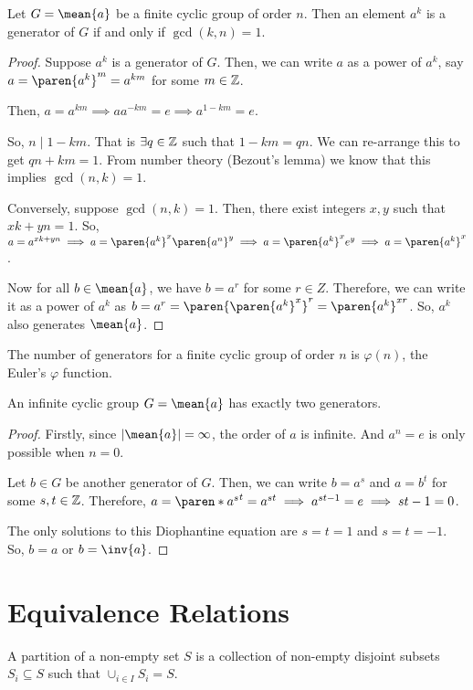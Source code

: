 \documentclass[11pt]{penrose}
\newcommand{\cyclic}[1]{\mean{#1}}
\newcommand{\keyword}[1]{\textsf{#1}}
\begin{document}
\begin{nthm}
    Let $G = \cyclic{a}$ be a finite cyclic group of order $n$. Then an element $a^k$ is a generator of $G$ if and only if $\gcd(k,n) = 1$.
\end{nthm}
\begin{proof}
    Suppose $a^k$ is a generator of $G$. Then, we can write $a$ as a power of $a^k$, say $a = \paren{a^k}^m = a^{km}$ for some $m \in \mathbb{Z}$.

    Then, $a = a^{km} \implies a a^{-km} = e \implies a^{1-km} = e$.

    So, $n \mid 1 - km$. That is $\exists q \in \mathbb{Z}$ such that $1 - km = qn$. We can re-arrange this to get $qn + km = 1$. From number theory (Bezout's lemma) we know that this implies $\gcd(n,k)=1$.

    Conversely, suppose $\gcd(n,k)=1$. Then, there exist integers $x, y$ such that $xk + yn = 1$. So, $a = a^{xk + yn} \implies a = \paren{a^{k}}^{x} \paren{a^{n}}^{y} \implies a = \paren{a^{k}}^{x} e^{y} \implies a = \paren{a^{k}}^{x}$.

    Now for all $b \in \cyclic{a}$, we have $b = a^r$ for some $r \in Z$. Therefore, we can write it as a power of $a^k$ as $b = a^r = \paren{\paren{a^{k}}^{x}}^{r} = \paren{a^{k}}^{xr}$. So, $a^k$ also generates $\cyclic{a}$.
\end{proof}

\begin{remark}
    The number of generators for a finite cyclic group of order $n$ is $\varphi(n)$, the Euler's $\varphi$ function.
\end{remark}

\begin{nthm}
    An infinite cyclic group $G = \cyclic{a}$ has exactly two generators.
\end{nthm}
\begin{proof}
    Firstly, since $|\cyclic{a}| = \infty$, the order of $a$ is infinite. And $a^n = e$ is only possible when $n = 0$.

    Let $b \in G$ be another generator of $G$. Then, we can write $b = a^s$ and $a = b^t$ for some $s, t \in \mathbb{Z}$. Therefore, $a = \paren*{a^{s}}^{t} = a^{st} \implies a^{st-1} = e \implies st-1 = 0$.
    
    The only solutions to this Diophantine equation are $s=t=1$ and $s=t=-1$. So, $b = a$ or $b = \inv{a}$.
\end{proof}

\section{Equivalence Relations}
\begin{ndfn}
    A \keyword{partition} of a non-empty set $S$ is a collection of non-empty disjoint subsets $S_i \subseteq S$ such that $\cup_{i \in I} S_i = S$.
\end{ndfn}
\end{document}
